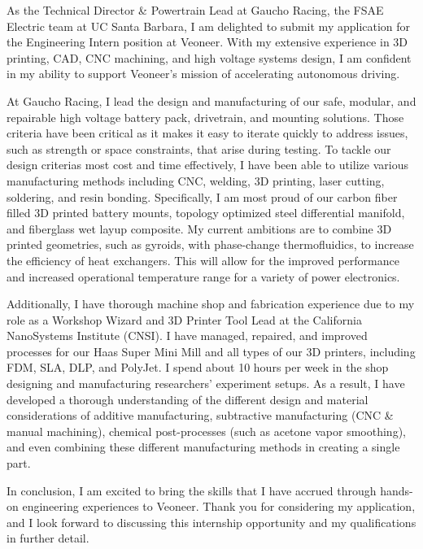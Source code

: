 \documentclass[11pt, letterpaper]{awesome-cv} %
\begin{document}
\makecvheader %

\makelettertitle %


\begin{cvletter}


As the Technical Director \& Powertrain Lead at Gaucho Racing, the FSAE Electric team at UC Santa Barbara, I am delighted to submit my application for the Engineering Intern position at Veoneer. With my extensive experience in 3D printing, CAD, CNC machining, and high voltage systems design, I am confident in my ability to support Veoneer's mission of accelerating autonomous driving.

At Gaucho Racing, I lead the design and manufacturing of our safe, modular, and repairable high voltage battery pack, drivetrain, and mounting solutions. Those criteria have been critical as it makes it easy to iterate quickly to address issues, such as strength or space constraints, that arise during testing. To tackle our design criterias most cost and time effectively, I have been able to utilize various manufacturing methods including CNC, welding, 3D printing, laser cutting, soldering, and resin bonding. Specifically, I am most proud of our carbon fiber filled 3D printed battery mounts, topology optimized steel differential manifold, and fiberglass wet layup composite. My current ambitions are to combine 3D printed geometries, such as gyroids, with phase-change thermofluidics, to increase the efficiency of heat exchangers. This will allow for the improved performance and increased operational temperature range for a variety of power electronics.

Additionally, I have thorough machine shop and fabrication experience due to my role as a Workshop Wizard and 3D Printer Tool Lead at the California NanoSystems Institute (CNSI). I have managed, repaired, and improved processes for our Haas Super Mini Mill and all types of our 3D printers, including FDM, SLA, DLP, and PolyJet. I spend about 10 hours per week in the shop designing and manufacturing researchers' experiment setups. As a result, I have developed a thorough understanding of the different design and material considerations of additive manufacturing, subtractive manufacturing (CNC \& manual machining), chemical post-processes (such as acetone vapor smoothing), and even combining these different manufacturing methods in creating a single part.

In conclusion, I am excited to bring the skills that I have accrued through hands-on engineering experiences to Veoneer. Thank you for considering my application, and I look forward to discussing this internship opportunity and my qualifications in further detail.


\end{cvletter}


\makeletterclosing %
\end{document}
